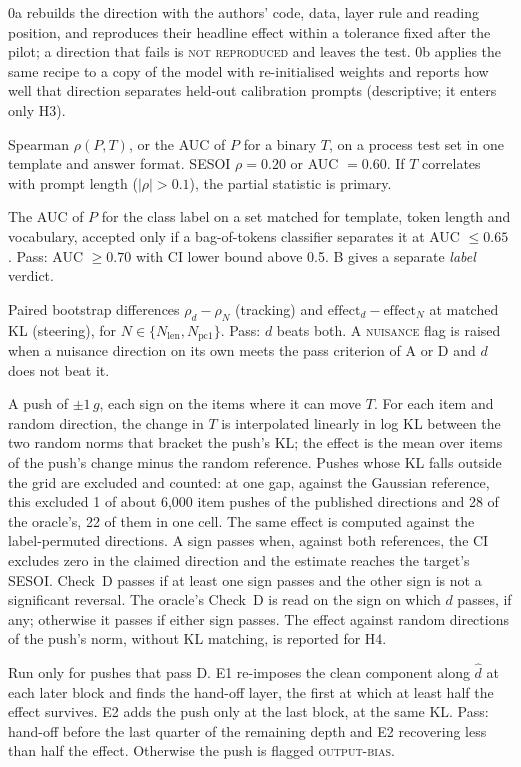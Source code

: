 \documentclass[11pt]{article}
\newcommand{\dhat}{\hat{d}}
\newcommand{\verdict}[1]{\textsc{\MakeLowercase{#1}}}
\begin{document}
\begin{description}[leftmargin=1.2em,style=nextline]
\item[Check 0 (reproduction and randomised-model calibration).] 0a rebuilds the direction with the authors' code, data, layer rule and reading position, and reproduces their headline effect within a tolerance fixed after the pilot; a direction that fails is \verdict{NOT REPRODUCED} and leaves the test. 0b applies the same recipe to a copy of the model with re-initialised weights and reports how well that direction separates held-out calibration prompts (descriptive; it enters only H3).
\item[Check A (tracking).] Spearman $\rho(P,T)$, or the AUC of $P$ for a binary $T$, on a process test set in one template and answer format. SESOI $\rho = 0.20$ or AUC $= 0.60$. If $T$ correlates with prompt length ($|\rho| > 0.1$), the partial statistic is primary.
\item[Check B (label survives matching).] The AUC of $P$ for the class label on a set matched for template, token length and vocabulary, accepted only if a bag-of-tokens classifier separates it at AUC $\le 0.65$. Pass: AUC $\ge 0.70$ with CI lower bound above 0.5. B gives a separate \emph{label} verdict.
\item[Check C (beats label-free directions).] Paired bootstrap differences $\rho_d - \rho_N$ (tracking) and $\text{effect}_d - \text{effect}_N$ at matched KL (steering), for $N \in \{N_\text{len}, N_\text{pc1}\}$. Pass: $d$ beats both. A \verdict{NUISANCE} flag is raised when a nuisance direction on its own meets the pass criterion of A or D and $d$ does not beat it.
\item[Check D (steers beyond matched random pushes).] A push of $\pm 1\,g$, each sign on the items where it can move $T$. For each item and random direction, the change in $T$ is interpolated linearly in log KL between the two random norms that bracket the push's KL; the effect is the mean over items of the push's change minus the random reference. Pushes whose KL falls outside the grid are excluded and counted: at one gap, against the Gaussian reference, this excluded 1 of about 6,000 item pushes of the published directions and 28 of the oracle's, 22 of them in one cell. The same effect is computed against the label-permuted directions. A sign passes when, against both references, the CI excludes zero in the claimed direction and the estimate reaches the target's SESOI. Check~D passes if at least one sign passes and the other sign is not a significant reversal. The oracle's Check~D is read on the sign on which $d$ passes, if any; otherwise it passes if either sign passes. The effect against random directions of the push's norm, without KL matching, is reported for H4.
\item[Check E (effect handed on).] Run only for pushes that pass D. E1 re-imposes the clean component along $\dhat$ at each later block and finds the hand-off layer, the first at which at least half the effect survives. E2 adds the push only at the last block, at the same KL. Pass: hand-off before the last quarter of the remaining depth and E2 recovering less than half the effect. Otherwise the push is flagged \verdict{OUTPUT-BIAS}.
\end{description}
\end{document}
